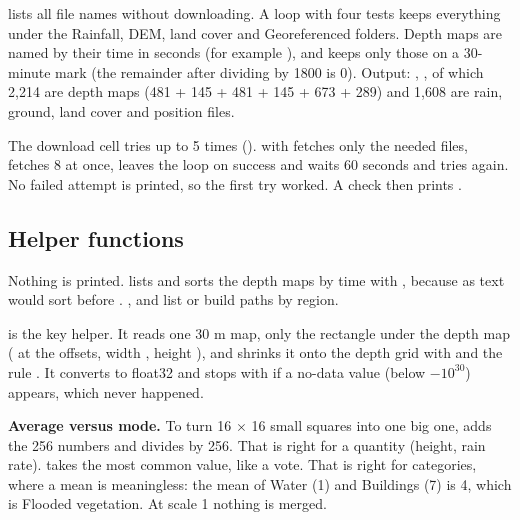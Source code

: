  lists all file names without downloading. A loop with four  tests keeps everything under the Rainfall, DEM, land cover and Georeferenced folders. Depth maps are named by their time in seconds (for example ), and  keeps only those on a 30-minute mark (the remainder after dividing by 1800 is 0). Output: , , of which 2,214 are depth maps (481 + 145 + 481 + 145 + 673 + 289) and 1,608 are rain, ground, land cover and position files.

The download cell tries up to 5 times ().  with  fetches only the needed files,  fetches 8 at once,  leaves the loop on success and  waits 60 seconds and tries again. No failed attempt is printed, so the first try worked. A check then prints .

\subsection{Helper functions}

Nothing is printed.  lists and sorts the depth maps by time with , because as text  would sort before . ,  and  list or build paths by region.

\textbf{} is the key helper. It reads one 30 m map, only the rectangle under the depth map ( at the offsets, width , height ), and shrinks it onto the depth grid with  and the rule . It converts to float32 and stops with  if a no-data value (below $-10^{30}$) appears, which never happened.

\begin{thinkbox}
\textbf{Average versus mode.} To turn 16 $\times$ 16 small squares into one big one,  adds the 256 numbers and divides by 256. That is right for a quantity (height, rain rate).  takes the most common value, like a vote. That is right for categories, where a mean is meaningless: the mean of Water (1) and Buildings (7) is 4, which is Flooded vegetation. At scale 1 nothing is merged.
\end{thinkbox}

